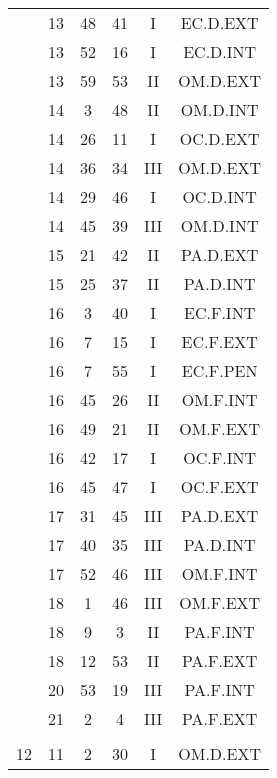 \documentclass[12pt, a4paper]{article}
\begin{document}
\begin{multicols}{3}
{\begin{tabular}{c c c c c c}
	 	 	 	 & 13 & 48 & 41 & I & EC.D.EXT\\%
	 	 	 	 & 13 & 52 & 16 & I & EC.D.INT\\%
	 	 	 	 & 13 & 59 & 53 & II & OM.D.EXT\\%
	 	 	 	 & 14 & 3 & 48 & II & OM.D.INT\\%
	 	 	 	 & 14 & 26 & 11 & I & OC.D.EXT\\%
	 	 	 	 & 14 & 36 & 34 & III & OM.D.EXT\\%
	 	 	 	 & 14 & 29 & 46 & I & OC.D.INT\\%
	 	 	 	 & 14 & 45 & 39 & III & OM.D.INT\\%
	 	 	 	 & 15 & 21 & 42 & II & PA.D.EXT\\%
	 	 	 	 & 15 & 25 & 37 & II & PA.D.INT\\%
	 	 	 	 & 16 & 3 & 40 & I & EC.F.INT\\%
	 	 	 	 & 16 & 7 & 15 & I & EC.F.EXT\\%
	 	 	 	 & 16 & 7 & 55 & I & EC.F.PEN\\%
	 	 	 	 & 16 & 45 & 26 & II & OM.F.INT\\%
	 	 	 	 & 16 & 49 & 21 & II & OM.F.EXT\\%
	 	 	 	 & 16 & 42 & 17 & I & OC.F.INT\\%
	 	 	 	 & 16 & 45 & 47 & I & OC.F.EXT\\%
	 	 	 	 & 17 & 31 & 45 & III & PA.D.EXT\\%
	 	 	 	 & 17 & 40 & 35 & III & PA.D.INT\\%
	 	 	 	 & 17 & 52 & 46 & III & OM.F.INT\\%
	 	 	 	 & 18 & 1 & 46 & III & OM.F.EXT\\%
	 	 	 	 & 18 & 9 & 3 & II & PA.F.INT\\%
	 	 	 	 & 18 & 12 & 53 & II & PA.F.EXT\\%
	 	 	 	 & 20 & 53 & 19 & III & PA.F.INT\\%
	 	 	 	 & 21 & 2 & 4 & III & PA.F.EXT\\%
	 	 	 	 & & & & & \\%
	 	 	 	12 & 11 & 2 & 30 & I & OM.D.EXT\\%
	 	 \end{tabular}
 	}
\end{multicols}
\end{document}
